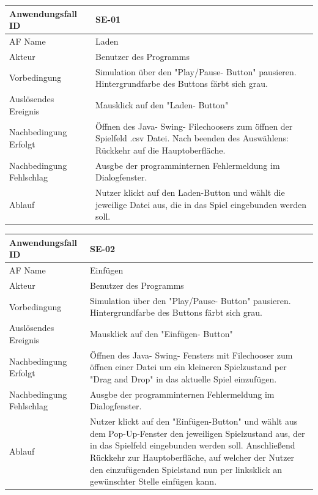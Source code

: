 \documentclass[11pt,a4paper]{article}
\begin{document}
    
    \begin{tabular}[m]{|m{7cm}|m{9cm}|}
        \hline
        Anwendungsfall ID     & SE-01 \\ %
        \hline
        AF Name     &  Laden \\
        \hline
        Akteur &  Benutzer des Programms \\
        \hline
        Vorbedingung & Simulation über den "Play/Pause- Button" pausieren. Hintergrundfarbe des Buttons färbt sich grau.\\
        \hline
        Auslösendes Ereignis & Mausklick auf den "Laden- Button"\\
        \hline
        Nachbedingung Erfolgt & Öffnen des Java- Swing- Filechoosers zum öffnen der Spielfeld .csv Datei. Nach beenden des Auswählens: Rückkehr auf die Hauptoberfläche.\\
        \hline
        Nachbedingung Fehlschlag & Ausgbe der programminternen Fehlermeldung im Dialogfenster.\\
        \hline
        Ablauf & Nutzer klickt auf den Laden-Button und wählt die jeweilige Datei aus, die in das Spiel eingebunden werden soll.\\
        \hline
    \end{tabular}
    \par
    
    
        \begin{tabular}[m]{|m{7cm}|m{9cm}|}
        \hline
        Anwendungsfall ID     & SE-02 \\ %
        \hline
        AF Name     &  Einfügen \\
        \hline
        Akteur&Benutzer des Programms \\
        \hline
        Vorbedingung & Simulation über den "Play/Pause- Button" pausieren. Hintergrundfarbe des Buttons färbt sich grau.\\
        \hline
        Auslösendes Ereignis & Mausklick auf den "Einfügen- Button"\\
        \hline
        Nachbedingung Erfolgt& Öffnen des Java- Swing- Fensters mit Filechooser zum öffnen einer Datei um ein kleineren Spielzustand per "Drag and Drop" in das aktuelle Spiel einzufügen.\\
        \hline
        Nachbedingung Fehlschlag&Ausgbe der programminternen Fehlermeldung im Dialogfenster.\\
        \hline
        Ablauf&Nutzer klickt auf den "Einfügen-Button" und wählt aus dem Pop-Up-Fenster den jeweiligen Spielzustand aus, der in das Spielfeld eingebunden werden soll. Anschließend Rückkehr zur Hauptoberfläche, auf welcher der Nutzer den einzufügenden Spielstand nun per linksklick an gewünschter Stelle einfügen kann.\\
        \hline
    \end{tabular}
    \par
    
\end{document}
